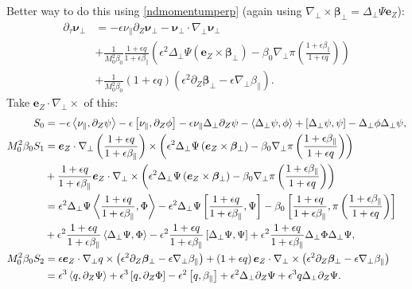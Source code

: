 \documentclass{article}
\newcommand{\para}{\parallel}
\newcommand{\ep}{\epsilon}
\newcommand{\np}{\nabla_\perp}
\newcommand{\lap}{\Delta_\perp}
\newcommand{\p}{\partial}
\newcommand{\fr}{\frac{1+\ep q}{1+\ep\beta_\para}}
\newcommand{\frinv}{\frac{1+\ep\beta_\para}{1+\ep q}}
\newcommand{\pth} [1] {\left( #1 \right) }
\newcommand{\br} [1] {\left[ #1 \right] }
\begin{document}
Better way to do this using \eqref{ndmomentumperp} (again using $\np\times\bm{\beta}_\perp = \lap\Psi\bm{e}_Z$):
\begin{align} 
    \p_\tau\bm{\nu}_\perp &= -\ep\nu_\para \p_Z\bm{\nu}_\perp - \bm{\nu}_\perp \cdot\np \bm{\nu}_\perp \nonumber \\ 
        &+ \frac{1}{M_0^2\beta_0} \fr\pth{\ep^2\lap\Psi \pth{\bm{e}_Z\times\bm{\beta}_\perp} - \beta_0\np\pi\pth{\frinv}} \\ 
        &+ \frac{1}{M_0^2\beta_0} \pth{1+\ep q} \pth{\ep^2\p_Z\bm{\beta}_\perp - \ep\np\beta_\para}. 
\end{align}
Take $\bm{e}_Z\cdot\np\times$ of this: 
\begin{align*}
    S_0 &= -\ep\Braket{\nu_\para, \p_Z\psi} -\ep\br{\nu_\para, \p_Z\phi} - \ep\nu_\para\lap\p_Z\psi - \Braket{\lap\psi, \phi} + \br{\lap\psi, \psi} - \lap\phi\lap\psi, \\ 
    M_0^2\beta_0 S_1 &= \bm{e}_Z\cdot \np\pth{\fr} \times \pth{\ep^2\lap\Psi \pth{\bm{e}_Z\times\bm{\beta}_\perp} - \beta_0\np\pi\pth{\frinv}} \\ 
    &+ \fr \bm{e}_Z\cdot\np\times \pth{\ep^2\lap\Psi \pth{\bm{e}_Z\times\bm{\beta}_\perp} - \beta_0\np\pi\pth{\frinv}} \\ 
        &= \ep^2\lap\Psi\Braket{\fr, \Phi} - \ep^2\lap\Psi\br{\fr, \Psi} - \beta_0 \br{\fr, \pi\pth{\frinv}} \\ 
        &+ \ep^2\fr \Braket{\lap\Psi, \Phi} - \ep^2\fr \br{\lap\Psi, \Psi} + \ep^2\fr\lap\Phi\lap\Psi, \\ 
    M_0^2\beta_0 S_2 &= \ep\bm{e}_Z\cdot \np q \times \pth{\ep^2\p_Z\bm{\beta}_\perp - \ep\np\beta_\para} + \pth{1+\ep q} \bm{e}_Z\cdot \np\times \pth{\ep^2\p_Z\bm{\beta}_\perp - \ep\np\beta_\para} \\ 
        &= \ep^3\Braket{q, \p_Z\Psi} + \ep^3\br{q, \p_Z\Phi} -\ep^2\br{q, \beta_\para} + \ep^2\lap\p_Z\Psi + \ep^3q\lap\p_Z\Psi. 
\end{align*}
\end{document}
